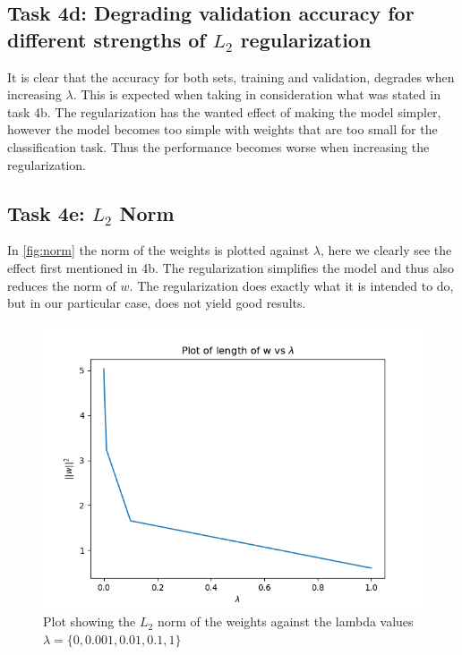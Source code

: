 \documentclass{article}
\begin{document}
\subsection{Task 4d: Degrading validation accuracy for different strengths of $L_2$ regularization}
It is clear that the accuracy for both sets, training and validation, degrades when increasing $\lambda$. This is expected when taking in consideration what was stated in task 4b. The regularization has the wanted effect of making the model simpler, however the model becomes too simple with weights that are too small for the classification task. Thus the performance becomes worse when increasing the regularization.


\subsection{Task 4e: $L_2$ Norm}
In \autoref{fig:norm} the norm of the weights is plotted against $\lambda$, here we clearly see the effect first mentioned in 4b. The regularization simplifies the model and thus also reduces the norm of $w$. The regularization does exactly what it is intended to do, but in our particular case, does not yield good results. 

\begin{figure}[H]
    \centering
    \includegraphics{Assignment_1/Assignments/plots/task4/task4d_l2_reg_norms.png}
    \caption{Plot showing the $L_2$ norm of the weights against the lambda values $\lambda= \{0, 0.001, 0.01, 0.1, 1\}$ }
    \label{fig:norm}
\end{figure}
\end{document}
